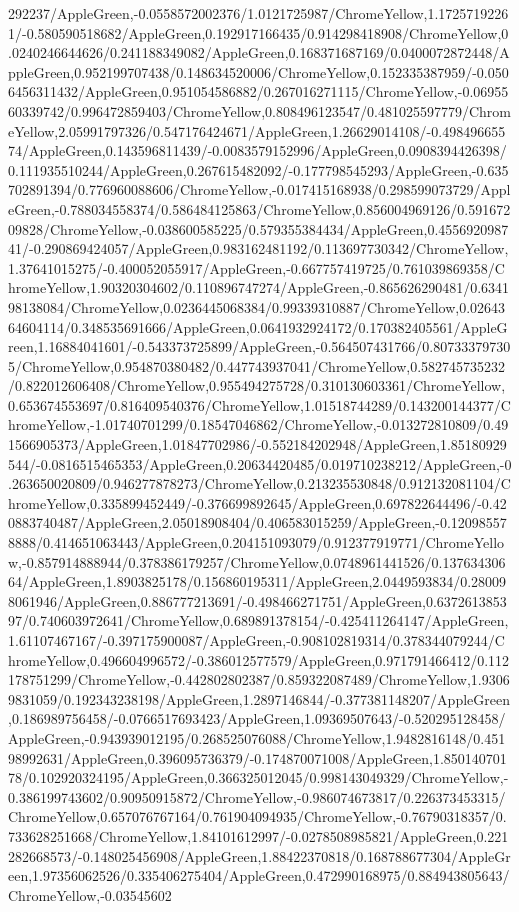 {\begin{tikzternal}
292237/AppleGreen,-0.0558572002376/1.0121725987/ChromeYellow,1.17257192261/-0.580590518682/AppleGreen,0.192917166435/0.914298418908/ChromeYellow,0.0240246644626/0.241188349082/AppleGreen,0.168371687169/0.0400072872448/AppleGreen,0.952199707438/0.148634520006/ChromeYellow,0.152335387959/-0.0506456311432/AppleGreen,0.951054586882/0.267016271115/ChromeYellow,-0.0695560339742/0.996472859403/ChromeYellow,0.808496123547/0.481025597779/ChromeYellow,2.05991797326/0.547176424671/AppleGreen,1.26629014108/-0.49849665574/AppleGreen,0.143596811439/-0.0083579152996/AppleGreen,0.0908394426398/0.111935510244/AppleGreen,0.267615482092/-0.177798545293/AppleGreen,-0.635702891394/0.776960088606/ChromeYellow,-0.017415168938/0.298599073729/AppleGreen,-0.788034558374/0.586484125863/ChromeYellow,0.856004969126/0.59167209828/ChromeYellow,-0.038600585225/0.579355384434/AppleGreen,0.455692098741/-0.290869424057/AppleGreen,0.983162481192/0.113697730342/ChromeYellow,1.37641015275/-0.400052055917/AppleGreen,-0.667757419725/0.761039869358/ChromeYellow,1.90320304602/0.110896747274/AppleGreen,-0.865626290481/0.634198138084/ChromeYellow,0.0236445068384/0.99339310887/ChromeYellow,0.0264364604114/0.348535691666/AppleGreen,0.0641932924172/0.170382405561/AppleGreen,1.16884041601/-0.543373725899/AppleGreen,-0.564507431766/0.807333797305/ChromeYellow,0.954870380482/0.447743937041/ChromeYellow,0.582745735232/0.822012606408/ChromeYellow,0.955494275728/0.310130603361/ChromeYellow,0.653674553697/0.816409540376/ChromeYellow,1.01518744289/0.143200144377/ChromeYellow,-1.01740701299/0.18547046862/ChromeYellow,-0.013272810809/0.491566905373/AppleGreen,1.01847702986/-0.552184202948/AppleGreen,1.85180929544/-0.0816515465353/AppleGreen,0.20634420485/0.019710238212/AppleGreen,-0.263650020809/0.946277878273/ChromeYellow,0.213235530848/0.912132081104/ChromeYellow,0.335899452449/-0.376699892645/AppleGreen,0.697822644496/-0.420883740487/AppleGreen,2.05018908404/0.406583015259/AppleGreen,-0.120985578888/0.414651063443/AppleGreen,0.204151093079/0.912377919771/ChromeYellow,-0.857914888944/0.378386179257/ChromeYellow,0.0748961441526/0.13763430664/AppleGreen,1.8903825178/0.156860195311/AppleGreen,2.0449593834/0.280098061946/AppleGreen,0.886777213691/-0.498466271751/AppleGreen,0.637261385397/0.740603972641/ChromeYellow,0.689891378154/-0.425411264147/AppleGreen,1.61107467167/-0.397175900087/AppleGreen,-0.908102819314/0.378344079244/ChromeYellow,0.496604996572/-0.386012577579/AppleGreen,0.971791466412/0.112178751299/ChromeYellow,-0.442802802387/0.859322087489/ChromeYellow,1.93069831059/0.192343238198/AppleGreen,1.2897146844/-0.377381148207/AppleGreen,0.186989756458/-0.0766517693423/AppleGreen,1.09369507643/-0.520295128458/AppleGreen,-0.943939012195/0.268525076088/ChromeYellow,1.9482816148/0.45198992631/AppleGreen,0.396095736379/-0.174870071008/AppleGreen,1.85014070178/0.102920324195/AppleGreen,0.366325012045/0.998143049329/ChromeYellow,-0.386199743602/0.90950915872/ChromeYellow,-0.986074673817/0.226373453315/ChromeYellow,0.657076767164/0.761904094935/ChromeYellow,-0.76790318357/0.733628251668/ChromeYellow,1.84101612997/-0.0278508985821/AppleGreen,0.221282668573/-0.148025456908/AppleGreen,1.88422370818/0.168788677304/AppleGreen,1.97356062526/0.335406275404/AppleGreen,0.472990168975/0.884943805643/ChromeYellow,-0.03545602
\end{tikzternal}}
